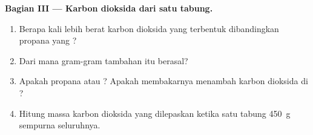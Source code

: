 \begin{problem}
\medskip
\noindent\textbf{Bagian III --- Karbon dioksida dari satu tabung.}
\begin{enumerate}[resume]
  \item Berapa kali lebih berat karbon dioksida yang terbentuk
        dibandingkan propana yang ?
  \item Dari mana gram-gram tambahan itu berasal?
  \item Apakah propana  atau ?
        Apakah membakarnya menambah karbon dioksida di ?
  \item Hitung massa karbon dioksida yang dilepaskan ketika satu tabung
        \qty{450}{g}  sempurna seluruhnya.
\end{enumerate}
\end{problem}
